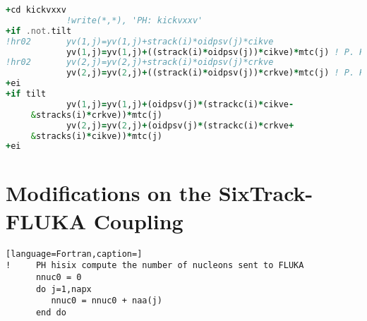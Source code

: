 \begin{appendix}
\begin{lstlisting}[language=Fortran,caption=Definition of the transfer map of a vertical dipole kick.]
+cd kickvxxv
            !write(*,*), 'PH: kickvxxv'
+if .not.tilt
!hr02       yv(1,j)=yv(1,j)+strack(i)*oidpsv(j)*cikve
            yv(1,j)=yv(1,j)+((strack(i)*oidpsv(j))*cikve)*mtc(j) ! P. HERMES                  !hr02
!hr02       yv(2,j)=yv(2,j)+strack(i)*oidpsv(j)*crkve
            yv(2,j)=yv(2,j)+((strack(i)*oidpsv(j))*crkve)*mtc(j) ! P. HERMES                  !hr02
+ei
+if tilt
            yv(1,j)=yv(1,j)+(oidpsv(j)*(strackc(i)*cikve-               &
     &stracks(i)*crkve))*mtc(j)
            yv(2,j)=yv(2,j)+(oidpsv(j)*(strackc(i)*crkve+               &
     &stracks(i)*cikve))*mtc(j)
+ei
\end{lstlisting}




\section{Modifications on the SixTrack-FLUKA Coupling}

\begin{lstlisting}[language=Fortran,caption=]
!     PH hisix compute the number of nucleons sent to FLUKA
      nnuc0 = 0
      do j=1,napx
         nnuc0 = nnuc0 + naa(j)
      end do
\end{lstlisting}




\end{appendix}